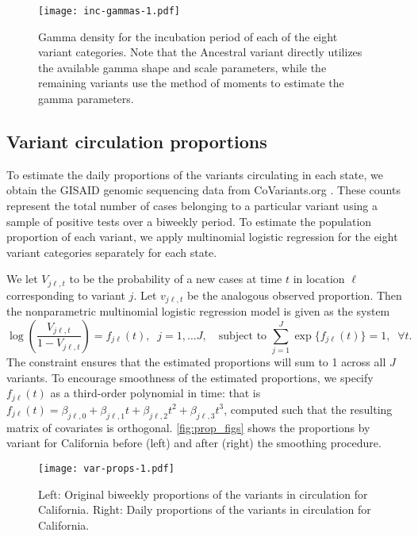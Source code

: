 \begin{figure}[!tb]
\centering
    \texttt{[image: inc-gammas-1.pdf]}
    \caption{Gamma density for the incubation period of each of the eight
    variant categories. Note that the Ancestral variant directly utilizes the
    available gamma shape and scale parameters, while the remaining variants use
    the method of moments to estimate the gamma parameters.}
    \label{fig:inc_gammas}
\end{figure}

\subsection{Variant circulation proportions}
\label{sec:variant-proportions}

To estimate the daily proportions of the variants circulating in each state, we
obtain the GISAID genomic sequencing data from CoVariants.org
\citep{hodcroft2021covariants, elbe2017data}. These counts represent the total
number of cases belonging to a particular variant using
a sample of positive tests over a biweekly period. To estimate the population
proportion of each variant, we apply multinomial logistic regression 
for the eight variant categories separately for each state.

We let $V_{j\ell,t}$ to be the probability of a new cases at time $t$ in location
$\ell$ corresponding to variant $j$. Let $v_{j\ell,t}$ be the analogous observed
proportion. Then the nonparametric multinomial logistic regression model is given
as the system
\begin{equation}
\log\left(\frac{V_{j\ell,t}}{1-V_{j\ell,t}}\right) = f_{j\ell}(t),\;\; j=1,\ldots J,\quad
\textrm{subject to }\sum_{j=1}^J \exp\{f_{j\ell}(t)\} = 1, \;\;\forall t.
\end{equation}
The constraint ensures that the estimated proportions will sum to 1 across all
$J$ variants. To encourage smoothness of the estimated proportions, we specify
$f_{j\ell}(t)$ as a third-order polynomial in time: that is $f_{j\ell}(t) =
\beta_{j\ell,0} + \beta_{j\ell,1} t + \beta_{j\ell,2}t^2 + \beta_{j\ell,3}t^3$,
computed such that the resulting matrix of covariates is orthogonal.
 \autoref{fig:prop_figs} shows the proportions by variant for California before
(left) and after (right) the smoothing procedure. 

\begin{figure}[!tb]
\centering
    \texttt{[image: var-props-1.pdf]}
    \caption{Left: Original biweekly proportions of the variants in circulation
    for California. Right: Daily proportions of the variants in circulation for
    California.}
    \label{fig:prop_figs}
\end{figure}

